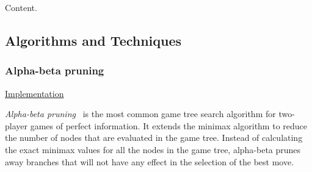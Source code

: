 \documentclass{article}
\begin{document}
Content.

\subsection{Algorithms and Techniques}

\subsubsection{Alpha-beta pruning}

\noindent
\href{https://github.com/davidrobles/mlnd-capstone-code/blob/master/capstone/player/alphabeta.py}
     {Implementation}
\break


\emph{Alpha-beta pruning}~\citep{Knuth1975AB} is the most common game tree search algorithm for
two-player games of perfect information. It extends the minimax algorithm to reduce the number of
nodes that are evaluated in the game tree. Instead of calculating the exact minimax values for all
the nodes in the game tree, alpha-beta prunes away branches that will not have any effect in the
selection of the best move.


\end{document}
